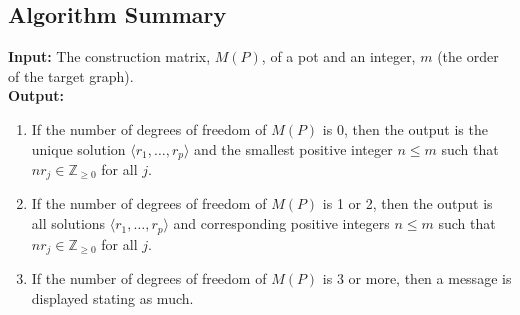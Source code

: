 \documentclass{elsarticle}
\theoremstyle{definition}
\theoremstyle{remark}
\theoremstyle{plain}
\theoremstyle{plain}
\begin{document}
\subsection{Algorithm Summary}\label{sec:program}
\noindent \textbf{Input:} The construction matrix, $M(P)$, of a pot and an integer, $m$ (the order of the target graph).\\

\noindent \textbf{Output: }
\begin{enumerate}
    \item If the number of degrees of freedom of $M(P)$ is 0, then the output is the unique solution $\langle r_1, \ldots, r_p \rangle$ and the smallest positive integer $n \leq m$ such that $nr_j \in \mathbb{Z}_{\geq 0}$ for all $j$.
    \item If the number of degrees of freedom of $M(P)$ is 1 or 2, then the output is all solutions $\langle r_1, \ldots, r_p \rangle$ and corresponding positive integers $n \leq m$ such that $nr_j \in \mathbb{Z}_{\geq 0}$ for all $j$.
    \item If the number of degrees of freedom of $M(P)$ is 3 or more, then a message is displayed stating as much.
\end{enumerate}
\end{document}
